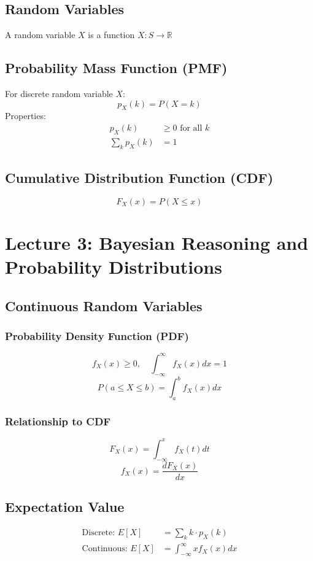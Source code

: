 \documentclass[10pt, twocolumn]{article}
\begin{document}
\subsection{Random Variables}
A random variable $X$ is a function $X: S \to \mathbb{R}$

\subsection{Probability Mass Function (PMF)}
For discrete random variable $X$:
\[ p_X(k) = P(X = k) \]
Properties:
\begin{align}
    p_X(k)        & \geq 0 \text{ for all } k \\
    \sum_k p_X(k) & = 1
\end{align}

\subsection{Cumulative Distribution Function (CDF)}
\[ F_X(x) = P(X \leq x) \]

\section{Lecture 3: Bayesian Reasoning and Probability Distributions}

\subsection{Continuous Random Variables}
\subsubsection{Probability Density Function (PDF)}
\[ f_X(x) \geq 0, \quad \int_{-\infty}^{\infty} f_X(x) dx = 1 \]
\[ P(a \leq X \leq b) = \int_a^b f_X(x) dx \]

\subsubsection{Relationship to CDF}
\[ F_X(x) = \int_{-\infty}^x f_X(t) dt \]
\[ f_X(x) = \frac{dF_X(x)}{dx} \]

\subsection{Expectation Value}
\begin{align}
    \text{Discrete: } E[X]   & = \sum_k k \cdot p_X(k)               \\
    \text{Continuous: } E[X] & = \int_{-\infty}^{\infty} x f_X(x) dx
\end{align}
\end{document}

